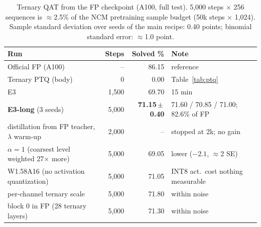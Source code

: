 \documentclass[11pt]{article}
\begin{document}
\begin{table}[t]
\centering
\caption{Ternary QAT from the FP checkpoint (A100, full test). 5,000 steps $\times$ 256 sequences is
$\approx$2.5\% of the NCM pretraining sample budget (50k steps $\times$ 1,024). Sample standard deviation over
seeds of the main recipe: 0.40 points; binomial standard error: $\approx$1.0 point.}
\label{tab:qat}
\small
\begin{tabular}{lrrl}
\toprule
Run & Steps & Solved \% & Note \\
\midrule
Official FP (A100)          & --    & 86.15 & reference \\
Ternary PTQ (body)          & 0     & 0.00  & Table~\ref{tab:ptq} \\
\midrule
E3                          & 1,500 & 69.70 & 15 min \\
\textbf{E3-long} (3 seeds)  & 5,000 & \textbf{71.15\,$\pm$\,0.40} & 71.60 / 70.85 / 71.00; 82.6\% of FP \\
\midrule
\quad distillation from FP teacher, $\lambda$ warm-up & 2,000 & -- & stopped at 2k; no gain \\
\quad $\alpha=1$ (coarsest level weighted 27$\times$ more) & 5,000 & 69.05 & lower ($-2.1$, $\approx$2 SE) \\
\quad W1.58A16 (no activation quantization)               & 5,000 & 71.05 & INT8 act.\ cost nothing measurable \\
\quad per-channel ternary scale                         & 5,000 & 71.80 & within noise \\
\quad block 0 in FP (28 ternary layers)       & 5,000 & 71.30 & within noise \\
\bottomrule
\end{tabular}
\end{table}
\end{document}
